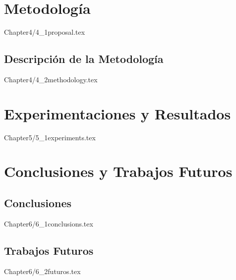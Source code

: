 \documentclass{report}
\begin{document}

\chapter{Metodología}
{Chapter4/4_1proposal.tex}

\section{Descripción de la Metodología}
{Chapter4/4_2methodology.tex}





\chapter{Experimentaciones y Resultados}
 {Chapter5/5_1experiments.tex}



\chapter{Conclusiones y Trabajos Futuros}

 \section{Conclusiones}
 {Chapter6/6_1conclusions.tex}

 \section{Trabajos Futuros}
 {Chapter6/6_2futuros.tex}








%


% 



\newpage

\end{document}
